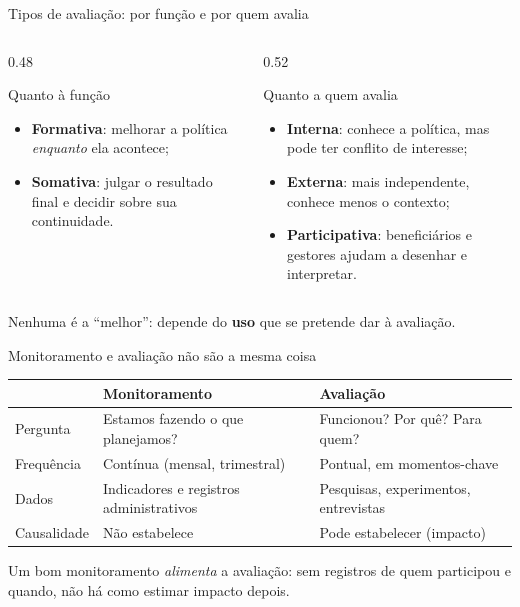 \begin{frame}{Tipos de avaliação: por função e por quem avalia}
  \begin{columns}[T]
    \begin{column}{0.48\textwidth}
      \begin{block}{Quanto à função}
        \footnotesize
        \begin{itemize}
          \item \textbf{Formativa}: melhorar a política \emph{enquanto} ela acontece;
          \item \textbf{Somativa}: julgar o resultado final e decidir sobre sua continuidade.
        \end{itemize}
      \end{block}
    \end{column}
    \begin{column}{0.52\textwidth}
      \begin{block}{Quanto a quem avalia}
        \footnotesize
        \begin{itemize}
          \item \textbf{Interna}: conhece a política, mas pode ter conflito de interesse;
          \item \textbf{Externa}: mais independente, conhece menos o contexto;
          \item \textbf{Participativa}: beneficiários e gestores ajudam a desenhar e interpretar.
        \end{itemize}
      \end{block}
    \end{column}
  \end{columns}
  \vspace{0.3cm}
  \centering\small Nenhuma é a ``melhor'': depende do \textbf{uso} que se pretende dar à avaliação.
\end{frame}

\begin{frame}{Monitoramento e avaliação não são a mesma coisa}
  \footnotesize
  \renewcommand{\arraystretch}{1.25}
  \begin{tabularx}{\textwidth}{@{}p{2.2cm}>{\raggedright\arraybackslash}X>{\raggedright\arraybackslash}X@{}}
    \toprule
    & \textbf{Monitoramento} & \textbf{Avaliação} \\ \midrule
    Pergunta & Estamos fazendo o que planejamos? & Funcionou? Por quê? Para quem? \\
    Frequência & Contínua (mensal, trimestral) & Pontual, em momentos-chave \\
    Dados & Indicadores e registros administrativos & Pesquisas, experimentos, entrevistas \\
    Causalidade & Não estabelece & Pode estabelecer (impacto) \\ \bottomrule
  \end{tabularx}
  \vspace{0.3cm}\par
  \small Um bom monitoramento \emph{alimenta} a avaliação: sem registros de quem participou e quando, não há como estimar impacto depois.
\end{frame}

